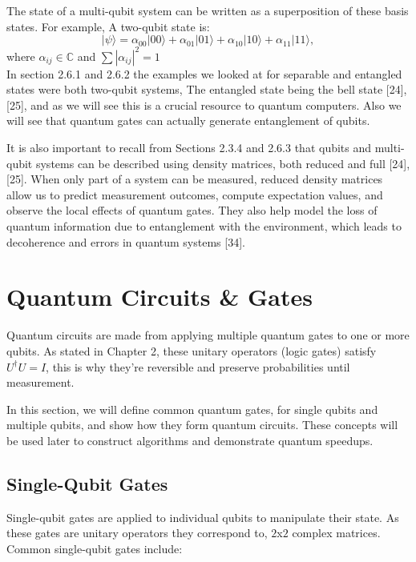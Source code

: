 \noindent The state of a multi-qubit system can be written as a superposition of these basis states. For example,  A two-qubit state is:
\[
|\psi\rangle = \alpha_{00}|00\rangle + \alpha_{01}|01\rangle + \alpha_{10}|10\rangle + \alpha_{11}|11\rangle,
\]
where $\alpha_{ij} \in \mathbb{C}$ and $\sum |\alpha_{ij}|^2 = 1$\\

\noindent In section 2.6.1 and 2.6.2 the examples we looked at for separable and entangled states were both two-qubit systems, The entangled state being the bell state [24], [25], and as we will see this is a crucial resource to quantum computers. Also we will see that quantum gates can actually generate entanglement of qubits.

\noindent It is also important to recall from Sections 2.3.4 and 2.6.3 that qubits and multi-qubit systems can be described using density matrices, both reduced and full [24],[25]. When only part of a system can be measured, reduced density matrices allow us to predict measurement outcomes, compute expectation values, and observe the local effects of quantum gates. They also help model the loss of quantum information due to entanglement with the environment, which leads to decoherence and errors in quantum systems [34].




\section{Quantum Circuits \& Gates}

\noindent Quantum circuits are made from applying multiple quantum gates to one or more qubits. As stated in Chapter 2, these unitary operators (logic gates) satisfy \( U^\dagger U = I \), this is why they're reversible and preserve probabilities until measurement.

\noindent In this section, we will define common quantum gates, for single qubits and multiple qubits, and show how they form quantum circuits. These concepts will be used later to construct algorithms and demonstrate quantum speedups.


\subsection{Single-Qubit Gates}

Single-qubit gates are applied to individual qubits to manipulate their state. As these gates are unitary operators they correspond to, $2$x$2$ complex matrices. Common single-qubit gates include:

